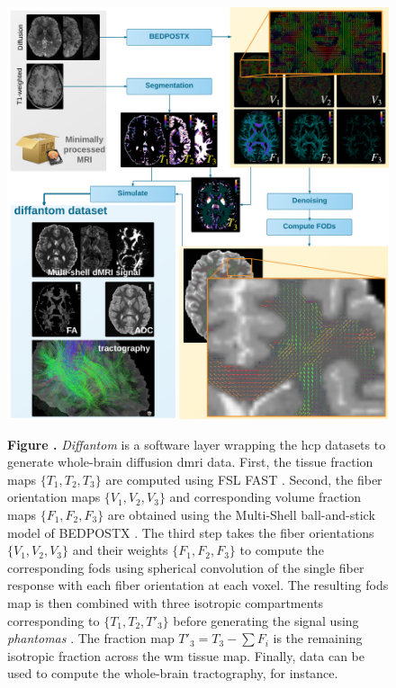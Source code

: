 \documentclass[english]{frontiers/frontiersSCNS} %
\begin{document}
\begin{figure}[h!]
\begin{center}
\includegraphics[width=\linewidth]{figures/figure01}
\end{center}
\textbf{\label{fig:figure1} Figure . }%
{\emph{Diffantom} is a software layer wrapping the \acrfull{hcp} datasets to generate whole-brain diffusion \gls*{dmri} data.
First, the tissue fraction maps $\{T_1, T_2, T_3\}$ are computed using FSL FAST \citep{zhang_segmentation_2001}.
Second, the fiber orientation maps $\{V_1, V_2, V_3\}$ and corresponding volume fraction maps $\{F_1, F_2, F_3\}$ are
  obtained using the Multi-Shell ball-and-stick model of BEDPOSTX \citep{jbabdi_modelbased_2012}.
The third step takes the fiber orientations $\{V_1, V_2, V_3\}$ and their weights $\{F_1, F_2, F_3\}$ to compute the
  corresponding \glspl{fod} using spherical convolution of the single fiber response with each fiber orientation at
  each voxel.
The resulting \glspl{fod} map is then combined with three isotropic compartments corresponding to $\{T_1, T_2, T'_3\}$
  before generating the signal using \emph{phantomas} \citep{caruyer_phantomas_2014}.
The fraction map $T'_3 = T_3 - \sum F_i$ is the remaining isotropic fraction across the \gls*{wm} tissue map.
Finally, data can be used to compute the whole-brain tractography, for instance.}
\end{figure}
\end{document}
